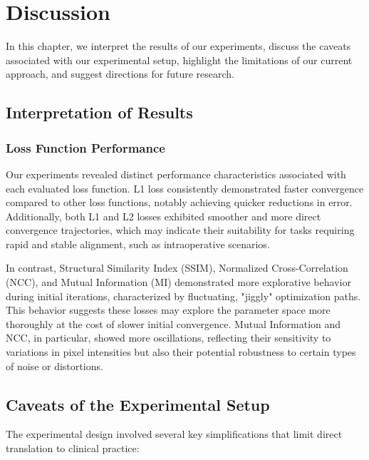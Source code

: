 
\chapter{Discussion}\label{chap:discussion}

In this chapter, we interpret the results of our experiments, discuss the caveats associated with our experimental setup, highlight the limitations of our current approach, and suggest directions for future research.

\section{Interpretation of Results}

\subsection{Loss Function Performance}
Our experiments revealed distinct performance characteristics associated with each evaluated loss function. L1 loss consistently demonstrated faster convergence compared to other loss functions, notably achieving quicker reductions in error. Additionally, both L1 and L2 losses exhibited smoother and more direct convergence trajectories, which may indicate their suitability for tasks requiring rapid and stable alignment, such as intraoperative scenarios.

In contrast, Structural Similarity Index (SSIM), Normalized Cross-Correlation (NCC), and Mutual Information (MI) demonstrated more explorative behavior during initial iterations, characterized by fluctuating, "jiggly" optimization paths. This behavior suggests these losses may explore the parameter space more thoroughly at the cost of slower initial convergence. Mutual Information and NCC, in particular, showed more oscillations, reflecting their sensitivity to variations in pixel intensities but also their potential robustness to certain types of noise or distortions.

\section{Caveats of the Experimental Setup}\label{sec:caveats}

The experimental design involved several key simplifications that limit direct translation to clinical practice:

